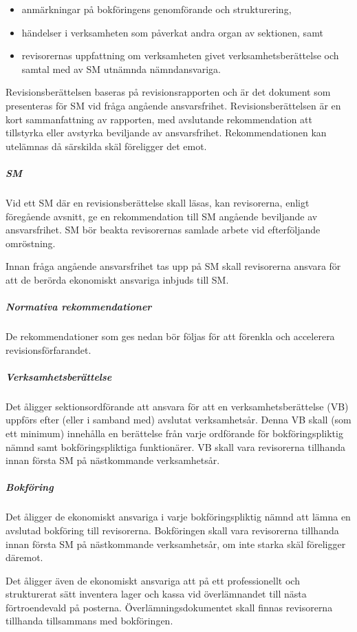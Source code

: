\documentclass{dgovdoc}
\begin{document}
\begin{itemize}
  \item anmärkningar på bokföringens genomförande och strukturering,
  \item händelser i verksamheten som påverkat andra organ av sektionen, samt
  \item revisorernas uppfattning om verksamheten givet verksamhetsberättelse
    och samtal med av SM utnämnda nämndansvariga.
\end{itemize}

Revisionsberättelsen baseras på revisionsrapporten och är det dokument som
presenteras för SM vid fråga angående ansvarsfrihet. Revisionsberättelsen är en
kort sammanfattning av rapporten, med avslutande rekommendation att tillstyrka
eller avstyrka beviljande av ansvarsfrihet. Rekommendationen kan utelämnas då
särskilda skäl föreligger det emot.

\subparagraph{SM}

Vid ett SM där en revisionsberättelse skall läsas, kan revisorerna, enligt
föregående avsnitt, ge en rekommendation till SM angående beviljande av
ansvarsfrihet. SM bör beakta revisorernas samlade arbete vid efterföljande
omröstning.

Innan fråga angående ansvarsfrihet tas upp på SM skall revisorerna ansvara för
att de berörda ekonomiskt ansvariga inbjuds till SM.

\subparagraph{Normativa rekommendationer}

De rekommendationer som ges nedan bör följas för att förenkla och accelerera
revisionsförfarandet.

\subparagraph{Verksamhetsberättelse}

Det åligger sektionsordförande att ansvara för att en verksamhetsberättelse
(VB) uppförs efter (eller i samband med) avslutat verksamhetsår. Denna VB skall
(som ett minimum) innehålla en berättelse från varje ordförande för
bokföringspliktig nämnd samt bokföringspliktiga funktionärer. VB skall vara
revisorerna tillhanda innan första SM på nästkommande verksamhetsår.

\subparagraph{Bokföring}

Det åligger de ekonomiskt ansvariga i varje bokföringspliktig nämnd att lämna
en avslutad bokföring till revisorerna. Bokföringen skall vara revisorerna
tillhanda innan första SM på nästkommande verksamhetsår, om inte starka skäl
föreligger däremot.

Det åligger även de ekonomiskt ansvariga att på ett professionellt och
strukturerat sätt inventera lager och kassa vid överlämnandet till nästa
förtroendevald på posterna. Överlämningsdokumentet skall finnas revisorerna
tillhanda tillsammans med bokföringen.
\end{document}
